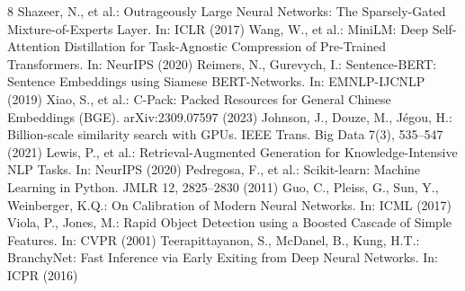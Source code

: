 \documentclass[runningheads]{llncs}
\begin{document}
\begin{thebibliography}{8}
 Shazeer, N., et al.: Outrageously Large Neural Networks:
The Sparsely-Gated Mixture-of-Experts Layer. In: ICLR (2017)
 Wang, W., et al.: MiniLM: Deep Self-Attention
Distillation for Task-Agnostic Compression of Pre-Trained Transformers. In:
NeurIPS (2020)
 Reimers, N., Gurevych, I.: Sentence-BERT: Sentence
Embeddings using Siamese BERT-Networks. In: EMNLP-IJCNLP (2019)
 Xiao, S., et al.: C-Pack: Packed Resources for General
Chinese Embeddings (BGE). arXiv:2309.07597 (2023)
 Johnson, J., Douze, M., J\'egou, H.: Billion-scale
similarity search with GPUs. IEEE Trans. Big Data 7(3), 535--547 (2021)
 Lewis, P., et al.: Retrieval-Augmented Generation for
Knowledge-Intensive NLP Tasks. In: NeurIPS (2020)
 Pedregosa, F., et al.: Scikit-learn: Machine
Learning in Python. JMLR 12, 2825--2830 (2011)
 Guo, C., Pleiss, G., Sun, Y., Weinberger, K.Q.: On
Calibration of Modern Neural Networks. In: ICML (2017)
 Viola, P., Jones, M.: Rapid Object Detection using a
Boosted Cascade of Simple Features. In: CVPR (2001)
 Teerapittayanon, S., McDanel, B., Kung,
H.T.: BranchyNet: Fast Inference via Early Exiting from Deep Neural Networks. In:
ICPR (2016)
\end{thebibliography}
\end{document}
